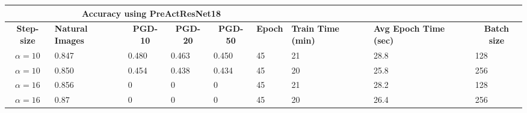 \documentclass{article}
\begin{document}
\begin{center}
\begin{table}[hbt!]
\begin{tabular}{|c|l|l|l|l|l|l|l|l|}
\hline
\multicolumn{1}{|l|}{{ }} & \multicolumn{4}{c|}{{ \textbf{Accuracy using
PreActResNet18}}}
& \multicolumn{4}{l|}{{ }}
\\ \hline
{ \textbf{Step-size}}     & \multicolumn{1}{p{1.5cm}|}{{ \textbf{Natural
Images}}} & \multicolumn{1}{c|}{{ \textbf{PGD-10}}} & \multicolumn{1}{c|}{{
\textbf{PGD-20}}} & \multicolumn{1}{c|}{{ \textbf{PGD-50}}} &
\multicolumn{1}{c|}{{ \textbf{Epoch}}} & \multicolumn{1}{p{1.5cm}|}{{
\textbf{Train Time (min)}}} & \multicolumn{1}{p{1.5cm}|}{{ \textbf{Avg Epoch
Time (sec)}}} & \multicolumn{1}{c|}{{ \textbf{Batch size}}} \\ \hline
{ $\alpha = 10$}       & { 0.847}                                        & {
0.480}                                & { 0.463}
& { 0.450}                                & { 45}
& { 21 }                               & { 28.8 }
& { 128}                                      \\ \hline
{ $\alpha = 10$}       & { 0.850}                                        & {
0.454}                                & { 0.438}
& { 0.434}                                & { 45}
& { 20 }                               & { 25.8 }
& { 256}                                      \\ \hline
{ $\alpha = 16$}       & { 0.856}                                        & { 0}
& { 0}                                    & { 0}
& { 45}                                  & { 21 }
& { 28.2 }                                 & { 128}
\\ \hline
{ $\alpha = 16$}       & { 0.87}                                         & { 0}
& { 0}                                    & { 0}
& { 45}                                  & { 20 }
& { 26.4 }                                 & { 256}
\\ \hline
\end{tabular}
\end{table}
\end{center}
\end{document}

